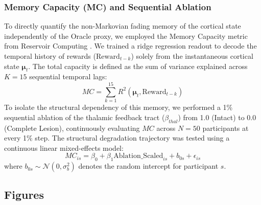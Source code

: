 \documentclass[12pt, a4paper]{extarticle}
\begin{document}
	\subsubsection{Memory Capacity (MC) and Sequential Ablation}
	To directly quantify the non-Markovian fading memory of the cortical state independently of the Oracle proxy, we employed the Memory Capacity metric from Reservoir Computing \parencite{jaeger2002}. We trained a ridge regression readout to decode the temporal history of rewards ($\text{Reward}_{t-k}$) solely from the instantaneous cortical state $\boldsymbol{\mu}_t$. The total capacity is defined as the sum of variance explained across $K=15$ sequential temporal lags:
	\begin{equation}
		MC = \sum_{k=1}^{15} R^2(\boldsymbol{\mu}_t, \text{Reward}_{t-k})
	\end{equation}
	To isolate the structural dependency of this memory, we performed a 1\% sequential ablation of the thalamic feedback tract ($\beta_{thal}$) from 1.0 (Intact) to 0.0 (Complete Lesion), continuously evaluating $MC$ across $N=50$ participants at every 1\% step. The structural degradation trajectory was tested using a continuous linear mixed-effects model:
	\begin{equation}
		MC_{is} = \beta_0 + \beta_1 \mathrm{Ablation\_Scaled}_{is} + b_{0s} + \epsilon_{is}
	\end{equation}
	where $b_{0s} \sim \mathcal{N}(0, \sigma_b^2)$ denotes the random intercept for participant $s$.

	\subsection{Figures}
	
	\clearpage
	\printbibliography
\end{document}
